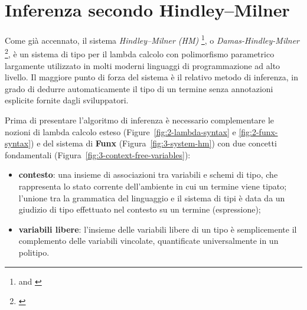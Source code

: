\section{Inferenza secondo Hindley–Milner}
\label{sec:3-4-hm-type-inference}

Come già accennato, il sistema \textit{Hindley–Milner (HM)}%
\footnote{ \cite{Hindley-1969-SchemeObject}
    and  \cite{Milner-1978-TheoryPolymorphism}},
o \textit{Damas-Hindley-Milner}%
\footnote{ \cite{Damas-1982-PrincipalSchemes}},
è un sistema di tipo per il lambda calcolo con polimorfismo parametrico largamente utilizzato
in molti moderni linguaggi di programmazione ad alto livello. Il maggiore punto di forza del sistema
è il relativo metodo di inferenza, in grado di dedurre automaticamente il tipo di un termine
senza annotazioni esplicite fornite dagli sviluppatori.


Prima di presentare l'algoritmo di inferenza è necessario complementare le nozioni di lambda calcolo esteso
(Figure~\ref{fig:2-lambda-syntax} e \ref{fig:2-funx-syntax}) e del sistema di \textbf{Funx} (Figura~\ref{fig:3-system-hm})
con due concetti fondamentali (Figura~\ref{fig:3-context-free-variables}):
\begin{itemize}
    \item \textbf{contesto}: una insieme di associazioni tra variabili e schemi di tipo,
          che rappresenta lo stato corrente dell'ambiente in cui un termine viene tipato; l'unione tra la grammatica
          del linguaggio e il sistema di tipi è data da un giudizio di tipo effettuato nel contesto su un termine (espressione);
    \item \textbf{variabili libere}: l'insieme delle variabili libere di un tipo è semplicemente il complemento
          delle variabili vincolate, quantificate universalmente in un politipo.
\end{itemize}


